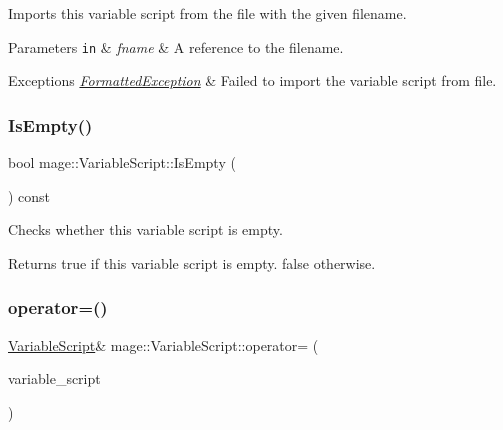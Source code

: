 Imports this variable script from the file with the given filename.


\begin{DoxyParams}[1]{Parameters}
\mbox{\tt in}  & {\em fname} & A reference to the filename. \\
\hline
\end{DoxyParams}

\begin{DoxyExceptions}{Exceptions}
{\em \hyperlink{classmage_1_1_formatted_exception}{Formatted\+Exception}} & Failed to import the variable script from file. \\
\hline
\end{DoxyExceptions}
\hypertarget{classmage_1_1_variable_script_a01386b6b5f5440c617909c452d9df308}{}\label{classmage_1_1_variable_script_a01386b6b5f5440c617909c452d9df308} 
\subsubsection{\texorpdfstring{Is\+Empty()}{IsEmpty()}}
{\footnotesize\ttfamily bool mage\+::\+Variable\+Script\+::\+Is\+Empty (\begin{DoxyParamCaption}{ }\end{DoxyParamCaption}) const\hspace{0.3cm}{\ttfamily [noexcept]}}

Checks whether this variable script is empty.

\begin{DoxyReturn}{Returns}
{\ttfamily true} if this variable script is empty. {\ttfamily false} otherwise. 
\end{DoxyReturn}
\hypertarget{classmage_1_1_variable_script_ae090b066ea939fc6611e77a47df6a97f}{}\label{classmage_1_1_variable_script_ae090b066ea939fc6611e77a47df6a97f} 
\subsubsection{\texorpdfstring{operator=()}{operator=()}\hspace{0.1cm}{\footnotesize\ttfamily [1/2]}}
{\footnotesize\ttfamily \hyperlink{classmage_1_1_variable_script}{Variable\+Script}\& mage\+::\+Variable\+Script\+::operator= (\begin{DoxyParamCaption}\item[{const \hyperlink{classmage_1_1_variable_script}{Variable\+Script} \&}]{variable\+\_\+script }\end{DoxyParamCaption})\hspace{0.3cm}{\ttfamily [delete]}}

